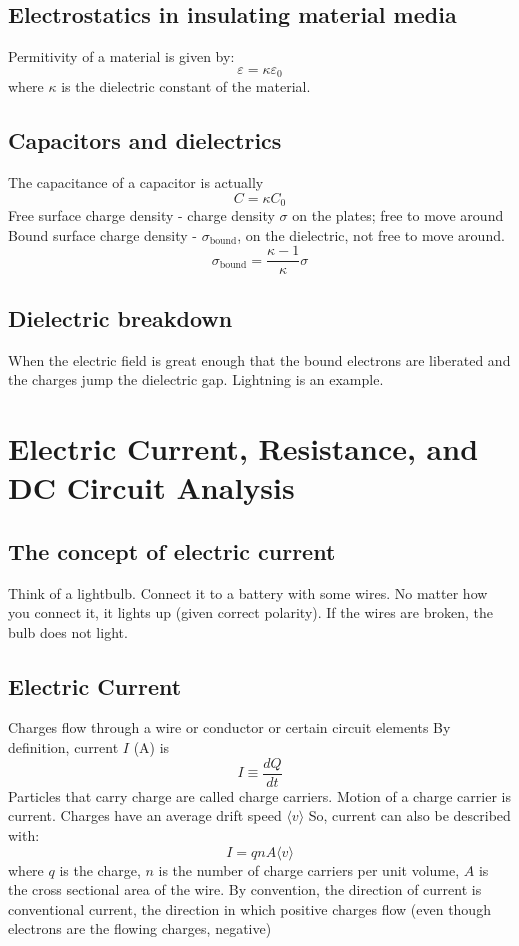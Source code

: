 \documentclass[twocolumn]{article}
\begin{document}
\subsection{Electrostatics in insulating material media}
\begin{outline}
	\1 Permitivity of a material is given by: \[\varepsilon=\kappa\varepsilon_0\] where $\kappa$ is the dielectric constant of the material. 
\end{outline}
\subsection{Capacitors and dielectrics}
\begin{outline}
	\1 The capacitance of a capacitor is actually \[C=\kappa C_0\]
	\1 Free surface charge density - charge density $\sigma$ on the plates; free to move around
	\1 Bound surface charge density - $\sigma_{\text{bound}}$, on the dielectric, not free to move around. \[\sigma_{\text{bound}}=\dfrac{\kappa-1}{\kappa}\sigma\]
\end{outline}
\subsection{Dielectric breakdown}
\begin{outline}
	\1 When the electric field is great enough that the bound electrons are liberated and the charges jump the dielectric gap. Lightning is an example. 
\end{outline}
\section{Electric Current, Resistance, and DC Circuit Analysis}
\subsection{The concept of electric current}
\begin{outline}
	\1 Think of a lightbulb. Connect it to a battery with some wires. No matter how you connect it, it lights up (given correct polarity). If the wires are broken, the bulb does not light. 
\end{outline}
\subsection{Electric Current}
\begin{outline}
	\1 Charges flow through a wire or conductor or certain circuit elements
	\1 By definition, current $I$ (A) is \[I\equiv\dfrac{dQ}{dt}\]
	\1 Particles that carry charge are called charge carriers. Motion of a charge carrier is current. 
	\1 Charges have an average drift speed \(\langle v\rangle\)
	\1 So, current can also be described with: \[I=qnA\langle v\rangle\] where $q$ is the charge, $n$ is the number of charge carriers per unit volume, $A$ is the cross sectional area of the wire. 
	\1 By convention, the direction of current is conventional current, the direction in which positive charges flow (even though electrons are the flowing charges, negative)

\end{outline}
\end{document}
